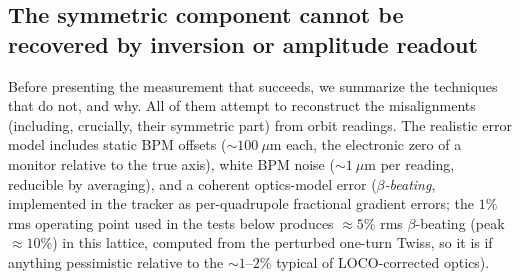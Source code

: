 \documentclass[aps,prab,reprint,superscriptaddress,nofootinbib]{revtex4-2}
\begin{document}
\subsection{The symmetric component cannot be recovered by inversion or
amplitude readout}
\label{sec:inverse}

Before presenting the measurement that succeeds, we summarize the techniques
that do not, and why.  All of them attempt to reconstruct the misalignments
(including, crucially, their symmetric part) from orbit readings.  The
realistic error model
includes static BPM offsets ($\sim\!100~\mu$m each, the electronic zero of a
monitor relative to the true axis), white BPM noise ($\sim\!1~\mu$m per
reading, reducible by averaging), and a coherent optics-model error (\emph{$\beta$-beating}, implemented in the
tracker as per-quadrupole fractional gradient errors; the $1\%$ rms operating
point used in the tests below produces $\approx\!5\%$ rms $\beta$-beating
(peak $\approx\!10\%$) in this lattice, computed from the perturbed one-turn
Twiss, so it is if anything pessimistic relative to the $\sim\!1$--$2\%$
typical of LOCO-corrected optics).
\end{document}

